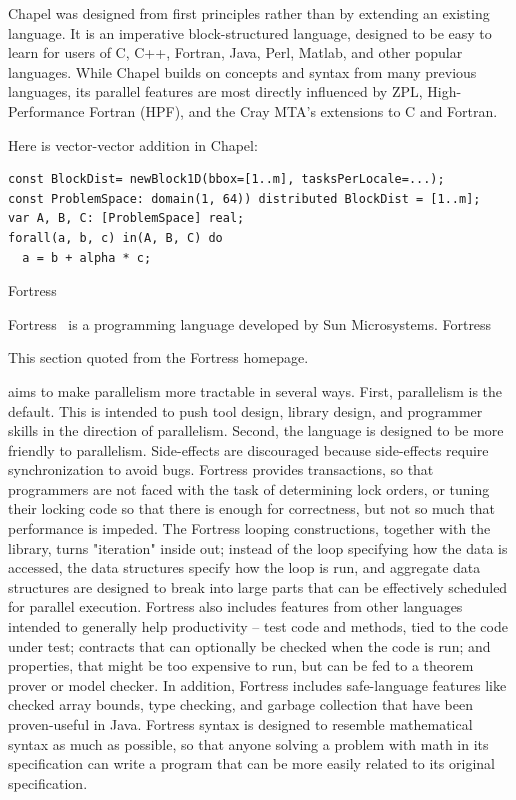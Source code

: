Chapel was designed from first principles rather than by extending an
existing language. It is an imperative block-structured language,
designed to be easy to learn for users of C, C++, Fortran, Java, Perl,
Matlab, and other popular languages. While Chapel builds on concepts
and syntax from many previous languages, its parallel features are
most directly influenced by ZPL, High-Performance Fortran (HPF), and
the Cray MTA's extensions to C and Fortran.

Here is vector-vector addition in Chapel:
\begin{verbatim}
const BlockDist= newBlock1D(bbox=[1..m], tasksPerLocale=...);
const ProblemSpace: domain(1, 64)) distributed BlockDist = [1..m];
var A, B, C: [ProblemSpace] real;
forall(a, b, c) in(A, B, C) do
  a = b + alpha * c;
\end{verbatim}


 {Fortress}

Fortress~\cite{Fortress:homepage} is a programming language developed
by Sun Microsystems.  Fortress
\begin{footnoteenv}
  {This section quoted from the
    Fortress homepage.}
\end{footnoteenv}
aims to make parallelism more tractable
in several ways. First, parallelism is the default. This is intended
to push tool design, library design, and programmer skills in the
direction of parallelism. Second, the language is designed to be more
friendly to parallelism. Side-effects are discouraged because
side-effects require synchronization to avoid bugs. Fortress provides
transactions, so that programmers are not faced with the task of
determining lock orders, or tuning their locking code so that there is
enough for correctness, but not so much that performance is
impeded. The Fortress looping constructions, together with the
library, turns "iteration" inside out; instead of the loop specifying
how the data is accessed, the data structures specify how the loop is
run, and aggregate data structures are designed to break into large
parts that can be effectively scheduled for parallel
execution. Fortress also includes features from other languages
intended to generally help productivity -- test code and methods, tied
to the code under test; contracts that can optionally be checked when
the code is run; and properties, that might be too expensive to run,
but can be fed to a theorem prover or model checker. In addition,
Fortress includes safe-language features like checked array bounds,
type checking, and garbage collection that have been proven-useful in
Java. Fortress syntax is designed to resemble mathematical syntax as
much as possible, so that anyone solving a problem with math in its
specification can write a program that can be more easily related to
its original specification.

